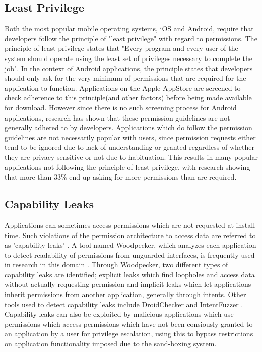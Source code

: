 \subsection{Least Privilege}
Both the most popular mobile operating systems, iOS and Android, require that developers follow the principle of "least privilege" with regard to permissions. The principle of least privilege states that "Every program and every user of the system should operate using the least set of privileges necessary to complete the job"\cite{schneider2004least}. In the context of Android applications, the principle states that developers should only ask for the very minimum of permissions that are required for the application to function\cite{enck2009understanding}. Applications on the Apple AppStore are screened to check adherence to this principle(and other factors) before being made available for download\cite{gilbert2011vision}. However since there is no such screening process for Android applications, research has shown that these permission guidelines are not generally adhered to by developers\cite{stevens2013asking}. Applications which do follow the permission guidelines are not necessarily popular with users, since permission requests either tend to be ignored due to lack of understanding\cite{felt2011android} \cite{kelley2012conundrum} or granted regardless of whether they are privacy sensitive or not due to habituation\cite{felt2012android}. This results in many popular applications not following the principle of least privilege\cite{wei2012permission}, with research showing that more than 33\% end up asking for more permissions than are required\cite{felt2011android}.

\subsection{Capability Leaks}
Applications can sometimes access permissions which are not requested at install time. Such violations of the permission architecture to access data are referred to as 'capability leaks' \cite{grace2012systematic} \cite{grace2011detecting}. A tool named Woodpecker, which analyzes each application to detect readability of permissions from unguarded interfaces, is frequently used in research in this domain \cite{zhou2012hey}. Through Woodpecker, two different types of capability leaks are identified; explicit leaks which find loopholes and access data without actually requesting permission and implicit leaks which let applications inherit permissions from another application, generally through intents. Other tools used to detect capability leaks include DroidChecker and IntentFuzzer \cite{yang2014intentfuzzer} \cite{chan2012droidchecker}. Capability leaks can also be exploited by malicious applications which use permissions which access permissions which have not been consiously granted to an application by a user for privilege escalation, using this to bypass restrictions on application functionality imposed due to the sand-boxing system\cite{davi2010privilege}.  

